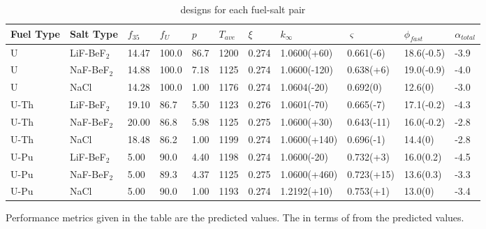 \begin{landscape}
	\begin{table}[ht!]
		\centering
		\caption{\DIFdelbeginFL {}\DIFdelendFL \DIFaddbeginFL {}\DIFaddendFL designs for each fuel-salt pair\DIFdelbeginFL %
\DIFdelendFL \DIFaddbeginFL \DIFaddFL{$^\star$}\DIFaddendFL }
		\begin{threeparttable}[t]
			\begin{tabular}{lllllllllll}
				\hline
				\textbf{Fuel Type} & \textbf{Salt Type}  & \textbf{$f_{35}$} &
				\textbf{$f_{U}$} & \textbf{$p$}	& \textbf{$T_{ave}$} & \textbf{$\xi$} &
				\textbf{$k_{\infty}$ \tnote{$\dagger$}}	& \textbf{$\varsigma$
					\tnote{$\ddagger$}}  & \textbf{$\phi_{fast}$ \tnote{$\perp$}} &
				\textbf{${\alpha_{total}}$ 	\tnote{$\wedge$}}  \\
				\hline

				U 	& LiF-BeF$_2$ 	& 14.47 & 100.0 & 86.7 & 1200 & 0.274 & 1.0600(+60) &
				0.661(-6) & 18.6(-0.5) 	& -3.9\\
				U 	& NaF-BeF$_2$ 	& 14.88 & 100.0 & 7.18 & 1125 & 0.274 & 1.0600(-120) &
				0.638(+6) & 19.0(-0.9) 	& -4.0\\
				U 	& NaCl 	& 14.28 & 100.0 & 1.00 & 1176 & 0.274 & 1.0604(-20) &
				0.692(0) & 12.6(0) 	& -3.0\\
				U-Th & LiF-BeF$_2$ 	& 19.10	& 86.7 & 5.50 & 1123 & 0.276 & 1.0601(-70) &
				0.665(-7) & 17.1(-0.2) 	& -4.3\\
				U-Th & NaF-BeF$_2$ 	& 20.00 & 86.8 & 5.98 & 1125 & 0.275 & 1.0600(+30) &
				0.643(-11) & 16.0(-0.2) & -2.8\\
				U-Th 	& NaCl 	& 18.48	& 86.2 	& 1.00 	& 1199 & 0.274 & 1.0600(+140) 	&
				0.696(-1) & 14.4(0)	& -2.8\\
				U-Pu & LiF-BeF$_2$ 	& 5.00 	& 90.0 	& 4.40 	& 1198 & 0.274 & 1.0600(-20) &
				0.732(+3) & 16.0(0.2) & -4.5\\
				U-Pu	& NaF-BeF$_2$ 	& 5.00 	& 89.3 & 4.37 & 1125 & 0.275 & 1.0600(+460) &
				0.723(+15) & 13.6(0.3) 	& -3.3\\
				U-Pu	& NaCl & 5.00 & 90.0 & 1.00 & 1193 	& 0.274 & 1.2192(+10) &
				0.753(+1) & 13.0(0)	& -3.4\\
				\hline
			\end{tabular}
            \DIFdelbeginFL %
\DIFdelendFL \DIFaddbeginFL \DIFaddFL{\rule{0in}{1.2em}$^\star$}\scriptsize \DIFaddendFL Performance metrics given in the table are the predicted values. The \DIFdelbeginFL {}\DIFdelendFL \DIFaddbeginFL {}\DIFaddendFL in terms of \DIFdelbeginFL {}\DIFdelendFL \DIFaddbeginFL {}\DIFaddendFL from the predicted values.
\DIFdelbeginFL %
\DIFdelendFL \DIFaddbeginFL


\end{threeparttable}
\end{table}
\end{landscape}
